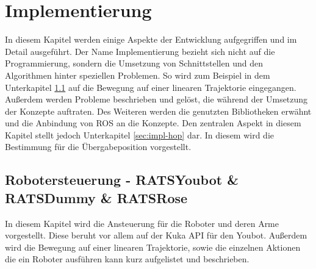 \section{Implementierung}
\label{sec:impl}

In diesem Kapitel werden einige Aspekte der Entwicklung aufgegriffen und im Detail ausgeführt. Der Name Implementierung bezieht sich nicht auf die Programmierung, sondern die Umsetzung von Schnittstellen und den Algorithmen hinter speziellen Problemen. So wird zum Beispiel in dem Unterkapitel \ref{sec:impl-rs} auf die Bewegung auf einer linearen Trajektorie eingegangen. Außerdem werden Probleme beschrieben und gelöst, die während der Umsetzung der Konzepte auftraten. Des Weiteren werden die genutzten Bibliotheken erwähnt und die Anbindung von ROS an die Konzepte. Den zentralen Aspekt in diesem Kapitel stellt jedoch Unterkapitel \ref{sec:impl-hop} dar. In diesem wird die Bestimmung für die Übergabeposition vorgestellt.

\subsection{Robotersteuerung - RATSYoubot \& RATSDummy \& RATSRose}
\label{sec:impl-rs}
In diesem Kapitel wird die Ansteuerung für die Roboter und deren Arme vorgestellt. Diese beruht vor allem auf der Kuka API für den Youbot. Außerdem wird die Bewegung auf einer linearen Trajektorie, sowie die einzelnen Aktionen die ein Roboter ausführen kann kurz aufgelistet und beschrieben.

